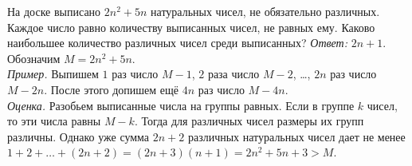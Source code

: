 \problem
На доске выписано $2 n^2 + 5 n$ натуральных чисел, не обязательно различных.
Каждое число равно количеству выписанных чисел, не равных ему.
Каково наибольшее количество различных чисел среди выписанных?
\solution
\emph{Ответ:} $2 n + 1$.
\\
Обозначим $M = 2 n^2 + 5 n$.
\\
\emph{Пример.}
Выпишем
$1$ раз число $M - 1$,
$2$ раза число $M - 2$, \ldots,
$2 n$ раз число $M - 2 n$.
После этого допишем ещё $4 n$ раз число $M - 4 n$.
\\
\emph{Оценка.}
Разобьем выписанные числа на группы равных.
Если в группе $k$ чисел, то эти числа равны $M - k$.
Тогда для различных чисел размеры их групп различны.
Однако уже сумма $2 n + 2$ различных натуральных чисел дает не менее
$1 + 2 + \ldots + (2 n + 2) = (2 n + 3) (n + 1) = 2 n^2 + 5 n + 3 > M$. 
\endproblem
